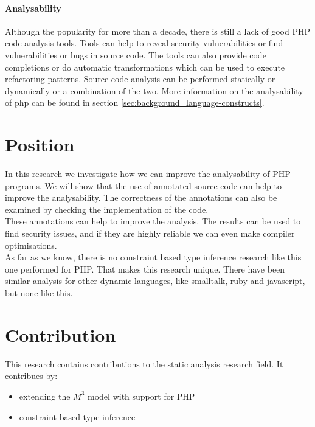 \documentclass[../main.tex]{subfiles}
\begin{document}
        \paragraph{Analysability}
        Although the popularity for more than a decade, there is still a lack of good PHP code analysis tools.
        Tools can help to reveal security vulnerabilities or find vulnerabilities or bugs in source code.
        The tools can also provide code completions or do automatic transformations which can be used to execute refactoring patterns.
        Source code analysis can be performed statically or dynamically or a combination of the two.
        More information on the analysability of php can be found in section \ref{sec:background_language-constructs}.
        
    \section{Position} %
        In this research we investigate how we can improve the analysability of PHP programs.
        We will show that the use of annotated source code can help to improve the analysability.
        The correctness of the annotations can also be examined by checking the implementation of the code. 
        \\
        These annotations can help to improve the analysis.
        The results can be used to find security issues, and if they are highly reliable we can even make compiler optimisations.
        \\
        As far as we know, there is no constraint based type inference research like this one performed for PHP.
        That makes this research unique.
        There have been similar analysis for other dynamic languages, like smalltalk, ruby and javascript, but none like this.
       
    \section{Contribution} %
        This research contains contributions to the static analysis research field.
        It contribues by:
        \begin{itemize}
            \item extending the $M^3$ model with support for PHP
            \item constraint based type inference
        \end{itemize}
\end{document}
